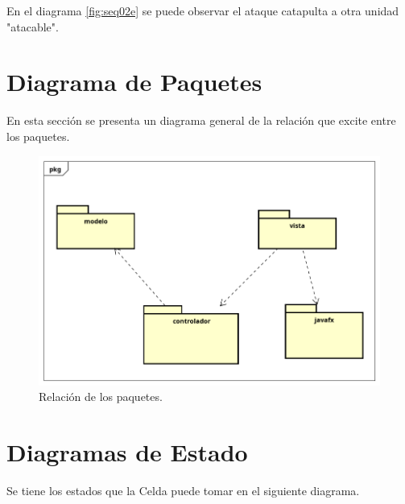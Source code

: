 \documentclass[titlepage,a4paper]{article}
\begin{document}
En el diagrama  \ref{fig:seq02e} se puede observar el ataque catapulta a otra unidad "atacable".

\section{Diagrama de Paquetes}\label{sec:diagramadepaquetes}

En esta sección se presenta un diagrama general de la relación que excite entre los paquetes.

\begin{figure}[H]
\centering
\includegraphics[width=\textwidth]{DiagramasDeSecuencia/Paquetes.png}
\caption{\label{fig:seq02w}Relación de los paquetes.}
\end{figure}

\section{Diagramas de Estado}\label{sec:diagramasdeestado}

Se tiene los estados que la Celda puede tomar en el siguiente diagrama.
\end{document}
